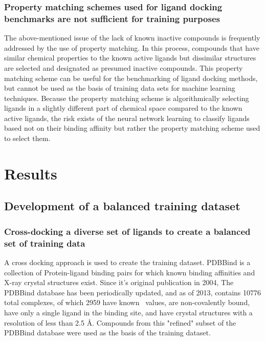 \subsubsection{Property matching schemes used for ligand docking benchmarks are not sufficient for training purposes}
The above-mentioned issue of the lack of known inactive compounds is frequently addressed by the use of property matching.
In this process, compounds that have similar chemical properties to the known active ligands but dissimilar structures are selected and designated as presumed inactive compounds\citep{Huang:2006gi, Mysinger:2012hu, Bauer:2013de}.
This property matching scheme can be useful for the benchmarking of ligand docking methods, but cannot be used as the basis of training data sets for machine learning techniques.
Because the property matching scheme is algorithmically selecting ligands in a slightly different part of chemical space compared to the known active ligands, the risk exists of the neural network learning to classify ligands based not on their binding affinity but rather the property matching scheme used to select them.

\section{Results}

\subsection{Development of a balanced training dataset}
\label{subsec:dataset_description}

\subsubsection{Cross-docking a diverse set of ligands to create a balanced set of training data}
\label{subsubsec:pdbbind_overview}
A cross docking approach is used to create the training dataset.
PDBBind\citep{Wang:2004cm} is a collection of Protein-ligand binding pairs for which known binding affinities and X-ray crystal structures exist.
Since it's original publication in 2004, The PDBBind database has been periodically updated, and as of 2013, contains 10776 total complexes, of which 2959 have known \ki\ values, are non-covalently bound, have only a single ligand in the binding site,  and have crystal structures with a resolution of less than 2.5 \AA.
Compounds from this "refined" subset of the PDBBind database were used as the basis of the training dataset.

